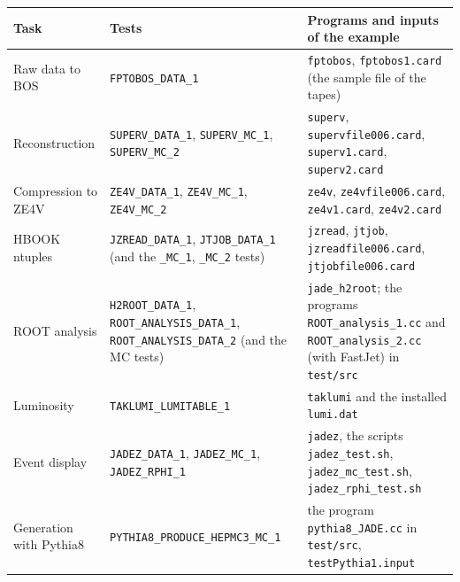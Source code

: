 \begin{table}[H]\centering\small
\begin{tabular}{|p{2.9cm}|p{5.4cm}|p{6.0cm}|}\hline
Task & Tests & Programs and inputs of the example \\\hline\hline
Raw data to BOS & \texttt{FPTOBOS\_\allowbreak{}DATA\_\allowbreak{}1} & \texttt{fptobos}, \texttt{fptobos1.card} (the sample file of the tapes) \\
Reconstruction & \texttt{SUPERV\_\allowbreak{}DATA\_\allowbreak{}1}, \texttt{SUPERV\_\allowbreak{}MC\_\allowbreak{}1}, \texttt{SUPERV\_\allowbreak{}MC\_\allowbreak{}2} & \texttt{superv}, \texttt{supervfile006.card}, \texttt{superv1.card}, \texttt{superv2.card} \\
Compression to ZE4V & \texttt{ZE4V\_\allowbreak{}DATA\_\allowbreak{}1}, \texttt{ZE4V\_\allowbreak{}MC\_\allowbreak{}1}, \texttt{ZE4V\_\allowbreak{}MC\_\allowbreak{}2} & \texttt{ze4v}, \texttt{ze4vfile006.card}, \texttt{ze4v1.card}, \texttt{ze4v2.card} \\
HBOOK ntuples & \texttt{JZREAD\_\allowbreak{}DATA\_\allowbreak{}1}, \texttt{JTJOB\_\allowbreak{}DATA\_\allowbreak{}1} (and the \texttt{\_MC\_1}, \texttt{\_MC\_2} tests) & \texttt{jzread}, \texttt{jtjob}, \texttt{jzreadfile006.card}, \texttt{jtjobfile006.card} \\
ROOT analysis & \texttt{H2ROOT\_\allowbreak{}DATA\_\allowbreak{}1}, \texttt{ROOT\_\allowbreak{}ANALYSIS\_\allowbreak{}DATA\_\allowbreak{}1}, \texttt{ROOT\_\allowbreak{}ANALYSIS\_\allowbreak{}DATA\_\allowbreak{}2} (and the MC tests) & \texttt{jade\_\allowbreak{}h2root}; the programs \texttt{ROOT\_\allowbreak{}analysis\_\allowbreak{}1.cc} and \texttt{ROOT\_\allowbreak{}analysis\_\allowbreak{}2.cc} (with FastJet) in \texttt{test/src} \\
Luminosity & \texttt{TAKLUMI\_\allowbreak{}LUMITABLE\_\allowbreak{}1} & \texttt{taklumi} and the installed \texttt{lumi.dat} \\
Event display & \texttt{JADEZ\_\allowbreak{}DATA\_\allowbreak{}1}, \texttt{JADEZ\_\allowbreak{}MC\_\allowbreak{}1}, \texttt{JADEZ\_\allowbreak{}RPHI\_\allowbreak{}1} & \texttt{jadez}, the scripts \texttt{jadez\_\allowbreak{}test.sh}, \texttt{jadez\_\allowbreak{}mc\_\allowbreak{}test.sh}, \texttt{jadez\_\allowbreak{}rphi\_\allowbreak{}test.sh} \\
Generation with Pythia8 & \texttt{PYTHIA8\_\allowbreak{}PRODUCE\_\allowbreak{}HEPMC3\_\allowbreak{}MC\_\allowbreak{}1} & the program \texttt{pythia8\_\allowbreak{}JADE.cc} in \texttt{test/src}, \texttt{testPythia1.input} \\

\end{tabular}
\end{table}
